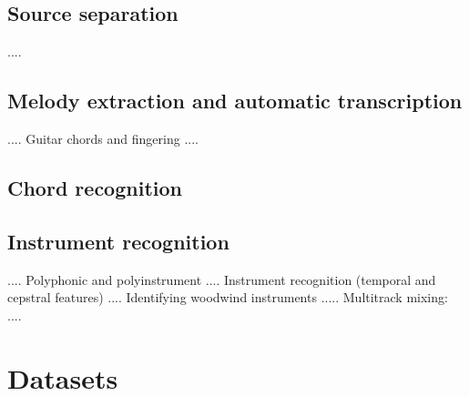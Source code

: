 \documentclass[journal]{IEEEtran}
\begin{document}
\subsection{Source separation}
\cite{slaney1994soundSeparation}....
\subsection{Melody extraction and automatic transcription}

\cite{benetos2013automatic,ohanlon2013automatic,peeters2006music}....
Guitar chords and fingering \cite{barbancho2012automatic}....
\subsection{Chord recognition}
\subsection{Instrument recognition}

\cite{martin1998musical,yu2014sparse}....
Polyphonic and polyinstrument \cite{hamel2009automatic}....
Instrument recognition (temporal and cepstral features) \cite{eronen2000musical}....
Identifying woodwind instruments \cite{brown2001feature}.....
Multitrack mixing: \cite{scottinstrument,scott2011automatic}....

\section{Datasets}

\ifCLASSOPTIONcaptionsoff
  \newpage
\fi







\end{document}
